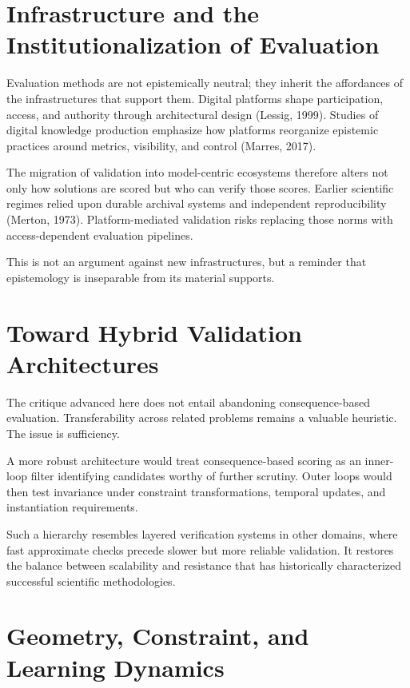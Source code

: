 \documentclass[11pt]{article}
\begin{document}
\section{Infrastructure and the Institutionalization of Evaluation}

Evaluation methods are not epistemically neutral; they inherit the affordances of the infrastructures that support them. Digital platforms shape participation, access, and authority through architectural design (Lessig, 1999). Studies of digital knowledge production emphasize how platforms reorganize epistemic practices around metrics, visibility, and control (Marres, 2017).

The migration of validation into model-centric ecosystems therefore alters not only how solutions are scored but who can verify those scores. Earlier scientific regimes relied upon durable archival systems and independent reproducibility (Merton, 1973). Platform-mediated validation risks replacing those norms with access-dependent evaluation pipelines.

This is not an argument against new infrastructures, but a reminder that epistemology is inseparable from its material supports.

\section{Toward Hybrid Validation Architectures}

The critique advanced here does not entail abandoning consequence-based evaluation. Transferability across related problems remains a valuable heuristic. The issue is sufficiency.

A more robust architecture would treat consequence-based scoring as an inner-loop filter identifying candidates worthy of further scrutiny. Outer loops would then test invariance under constraint transformations, temporal updates, and instantiation requirements.

Such a hierarchy resembles layered verification systems in other domains, where fast approximate checks precede slower but more reliable validation. It restores the balance between scalability and resistance that has historically characterized successful scientific methodologies.

\section{Geometry, Constraint, and Learning Dynamics}
\end{document}
